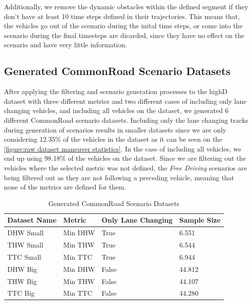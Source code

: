 \documentclass[conference]{IEEEtran}
\begin{document}
Additionally, we remove the dynamic obstacles within the defined segment if they don't have at least 10 time steps defined in their trajectories. This means that, the vehicles go out of the scenario during the inital time steps, or come into the scenario during the final timesteps are dicarded, since they have no effect on the scenario and have very little information.

\subsection{Generated CommonRoad Scenario Datasets}
\label{subsection:generated commonroad datasets}
After applying the filtering and scenario generation processes to the highD dataset with three different metrics and two different cases of including only lane changing vehicles, and including all vehicles on the dataset, we generated 6 different CommonRoad scenario datasets. Including only the lane changing tracks during generation of scenarios results in smaller datasets since we are only considering 12.35\% of the vehicles in the dataset as it can be seen on the \autoref{figure:raw dataset maneuver statistics}. In the case of including all vehicles, we end up using 98.18\% of the vehicles on the dataset. Since we are filtering out the vehicles where the selected metric was not defined, the \textit{Free Driving} scenarios are being filtered out as they are not following a preceding vehicle, meaning that none of the metrics are defined for them.\\

\begin{table}[!h]
	\centering
    \caption{Generated CommonRoad Scenario Datasets}
    \begin{tabularx}{\columnwidth}{|X||X|X|X|}
 		\hline
 		Dataset Name & Metric & Only Lane Changing & Sample Size\\
 		\hline
 		DHW Small & Min DHW & True  & 6.551\\
 		THW Small & Min THW & True  & 6.544\\
 		TTC Small & Min TTC & True  & 6.944\\
 		DHW Big   & Min DHW & False & 44.812\\
 		THW Big   & Min THW & False & 44.107\\
 		TTC Big   & Min TTC & False & 44.280\\
 		\hline
	\end{tabularx}
	\label{table:generated datasets}
\end{table}
\end{document}
